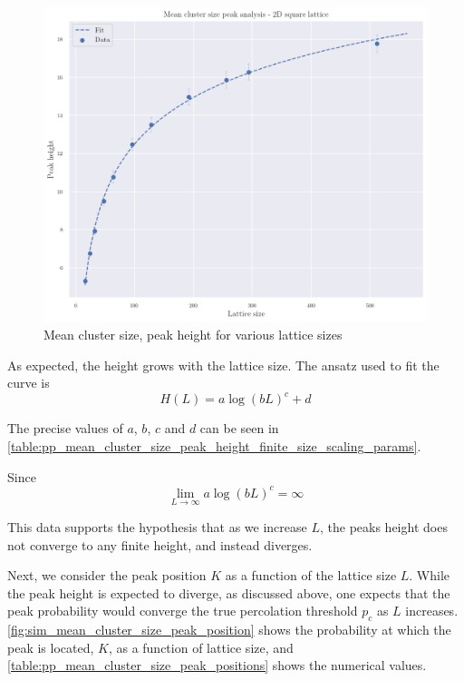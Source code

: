 \begin{figure}[H]
  \includegraphics[width=\linewidth]{Images/sim_mean_cluster_size_peak_height.png}
  \caption{Mean cluster size, peak height for various lattice sizes}
  \label{fig:sim_mean_cluster_size_peak_height}
\end{figure}

As expected, the height grows with the lattice size. The ansatz used to fit the curve is
$$ 
H(L) = a \log(bL)^c + d
$$

The precise values of $a$, $b$, $c$ and $d$ can be seen in \autoref{table:pp_mean_cluster_size_peak_height_finite_size_scaling_params}.

Since 
$$
\lim_{L\to\infty} a \log(bL)^c = \infty
$$

This data supports the hypothesis that as we increase $L$, the peaks height does not converge to any finite height, and instead diverges.


Next, we consider the peak position $K$ as a function of the lattice size $L$. While the peak height is expected to diverge, as discussed above, one expects that the peak probability would converge the true percolation threshold $p_c$ as $L$ increases. 
\autoref{fig:sim_mean_cluster_size_peak_position} shows the probability at which the peak is located, $K$, as a function of lattice size, and \autoref{table:pp_mean_cluster_size_peak_positions} shows the numerical values.


